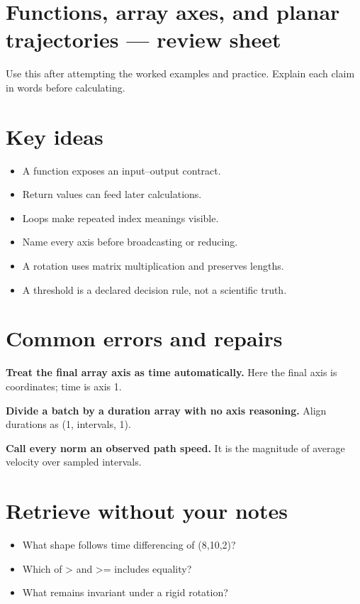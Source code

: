 \documentclass[11pt,letterpaper]{article}
\theoremstyle{definition}\newtheorem{definition}{Definition}\newtheorem{example}{Example}
\numberwithin{equation}{section}
\begin{document}
\section*{Functions, array axes, and planar trajectories --- review sheet}
Use this after attempting the worked examples and practice. Explain each claim in words before calculating.

\section*{Key ideas}
\begin{itemize}
\item A function exposes an input--output contract.
\item Return values can feed later calculations.
\item Loops make repeated index meanings visible.
\item Name every axis before broadcasting or reducing.
\item A rotation uses matrix multiplication and preserves lengths.
\item A threshold is a declared decision rule, not a scientific truth.
\end{itemize}
\section*{Common errors and repairs}
\textbf{Treat the final array axis as time automatically.} Here the final axis is coordinates; time is axis 1.

\textbf{Divide a batch by a duration array with no axis reasoning.} Align durations as (1, intervals, 1).

\textbf{Call every norm an observed path speed.} It is the magnitude of average velocity over sampled intervals.

\section*{Retrieve without your notes}
\begin{itemize}
\item What shape follows time differencing of (8,10,2)?
\item Which of > and >=\allowbreak{} includes equality?
\item What remains invariant under a rigid rotation?
\end{itemize}
\end{document}
